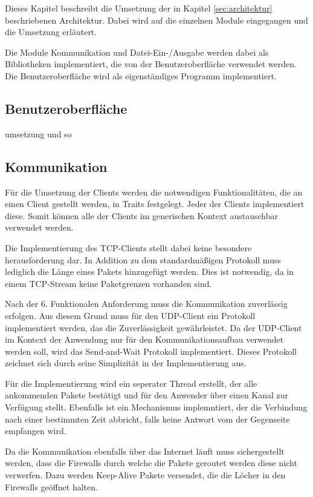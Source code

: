 Dieses Kapitel beschreibt die Umsetzung der in Kapitel \ref{sec:architektur} beschriebenen Architektur. Dabei wird auf die einzelnen Module eingegangen und die Umsetzung erläutert. 

Die Module Kommunikation und Datei-Ein-/Ausgabe werden dabei als Bibliotheken implementiert, die von der Benutzeroberfläche verwendet werden. Die Benutzeroberfläche wird als eigenständiges Programm implementiert.

\subsection{Benutzeroberfläche}
umsetzung und so

\subsection{Kommunikation}
Für die Umsetzung der Clients werden die notwendigen Funktionalitäten, die an einen Client gestellt werden, in Traits festgelegt. Jeder der Clients implementiert diese. Somit können alle der Clients im generischen Kontext austauschbar verwendet werden.

Die Implementierung des TCP-Clients stellt dabei keine besondere herausforderung dar. In Addition zu dem standardmäßigen Protokoll muss lediglich die Länge eines Pakets hinzugefügt werden. Dies ist notwendig, da in einem TCP-Stream keine Paketgrenzen vorhanden sind.

Nach der 6. Funktionalen Anforderung muss die Kommunikation zuverlässig erfolgen. Aus diesem Grund muss für den UDP-Client ein Protokoll implementiert werden, das die Zuverlässigkeit gewährleistet. Da der UDP-Client im Kontext der Anwendung nur für den Kommunikationsaufbau verwendet werden soll, wird das Send-and-Wait Protokoll implementiert. Dieses Protokoll zeichnet sich durch seine Simplizität in der Implementierung aus. \cite[195]{ethz-vernetzte-systeme}

Für die Implementierung wird ein seperater Thread erstellt, der alle ankommenden Pakete bestätigt und für den Anwender über einen Kanal zur Verfügung stellt. Ebenfalls ist ein Mechanismus implemntiert, der die Verbindung nach einer bestimmten Zeit abbricht, falls keine Antwort vom der Gegenseite empfangen wird.

Da die Kommunikation ebenfalls über das Internet läuft muss sichergestellt werden, dass die Firewalls durch welche die Pakete geroutet werden diese nicht verwerfen. Dazu werden Keep-Alive Pakete versendet, die die Löcher in den Firewalls geöffnet halten. \cite{enginner-man-udp}

